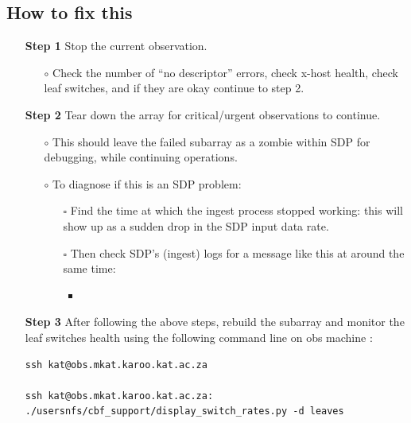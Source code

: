 \subsection{ How to fix this}
\begin{itemize}
	\item[\textbf{Step 1}] Stop the current observation.
	  \begin{itemize}
	    \item[$\circ$] Check the number of “no descriptor” errors, check x-host health, check leaf switches, and if they are okay continue to step 2.	
    \end{itemize}

\item[\textbf{Step 2}] Tear down the array for critical/urgent observations to continue.
 \begin{itemize}
 	\item[$\circ$] This should leave the failed subarray as a zombie within SDP for debugging, while continuing operations.
 	\item[$\circ$] To diagnose if this is an SDP problem: 
 	 \begin{itemize}
	\item[$\square$] Find the time at which the ingest process stopped working: this will show up as a sudden drop in the SDP input data rate. 
	\item[$\square$] Then check SDP’s (ingest) logs for a message like this at around the same time:
	 \begin{itemize}
	 \item{} 	
	   \end{itemize}
    \end{itemize}	
\end{itemize}
\item[\textbf{Step 3}] After following the above steps, rebuild the subarray and monitor the leaf switches health using the following command line on obs machine : 


\begin{lstlisting}[style=DOS]
ssh kat@obs.mkat.karoo.kat.ac.za

ssh kat@obs.mkat.karoo.kat.ac.za: ./usersnfs/cbf_support/display_switch_rates.py -d leaves
\end{lstlisting}









\end{itemize}

